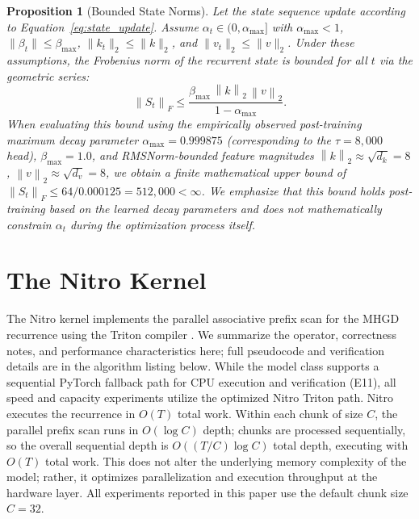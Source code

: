 \documentclass{article}
\newtheorem{proposition}{Proposition}
\newcommand{\norm}[1]{\left\|#1\right\|}
\begin{document}
\begin{proposition}[Bounded State Norms]
Let the state sequence update according to Equation~\eqref{eq:state_update}. Assume $\alpha_t \in (0, \alpha_{\max}]$ with $\alpha_{\max} < 1$, $\|\beta_t\| \leq \beta_{\max}$, $\|k_t\|_2 \leq \|k\|_2$, and $\|v_t\|_2 \leq \|v\|_2$. Under these assumptions, the Frobenius norm of the recurrent state is bounded for all $t$ via the geometric series:
\begin{equation}
  \norm{S_t}_F \leq \frac{\beta_{\max}\,\norm{k}_2\,\norm{v}_2}{1 - \alpha_{\max}}.
\end{equation}
When evaluating this bound using the empirically observed post-training maximum decay parameter $\alpha_{\max} = 0.999875$ (corresponding to the $\tau=8{,}000$ head), $\beta_{\max} = 1.0$, and RMSNorm-bounded feature magnitudes $\norm{k}_2 \approx \sqrt{d_k} = 8$, $\norm{v}_2 \approx \sqrt{d_v} = 8$, we obtain a finite mathematical upper bound of $\norm{S_t}_F \leq 64 / 0.000125 = 512{,}000 < \infty$. We emphasize that this bound holds post-training based on the learned decay parameters and does not mathematically constrain $\alpha_t$ during the optimization process itself.
\end{proposition}

\section{The Nitro Kernel}
\label{sec:nitro}

The Nitro kernel implements the parallel associative prefix scan for the MHGD recurrence using the Triton compiler \cite{tillet2019triton}. We summarize the operator, correctness notes, and performance characteristics here; full pseudocode and verification details are in the algorithm listing below. While the model class supports a sequential PyTorch fallback path for CPU execution and verification (E11), all speed and capacity experiments utilize the optimized Nitro Triton path. Nitro executes the recurrence in $O(T)$ total work. Within each chunk of size $C$, the parallel prefix scan runs in $O(\log C)$ depth; chunks are processed sequentially, so the overall sequential depth is $O((T/C) \log C)$ total depth, executing with $O(T)$ total work. This does not alter the underlying memory complexity of the model; rather, it optimizes parallelization and execution throughput at the hardware layer. All experiments reported in this paper use the default chunk size $C = 32$.
\end{document}
